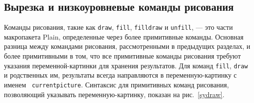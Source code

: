 \documentclass{article} %
\begin{document}
\subsection{Вырезка и низкоуровневые команды рисования}

Команды рисования, такие как {\tt draw}, {\tt fill}, {\tt filldraw} и 
{\tt unfill}, --- это части макропакета Plain,  
определенные через более примитивные команды.
Основная разница между командами рисования, рассмотренными в 
предыдущих разделах, и более примитивными в том, что все примитивные 
команды рисования требуют указания переменной-картинки для хранения 
результатов.
Для команд {\tt fill}, {\tt draw} и родственных им, результаты всегда 
направляются в переменную-картинку с именем {\tt
currentpicture}\label{Dcurpic}.
Синтаксис для примитивных команд рисования, позволяющий указывать 
переменную-картинку, показан на рис.~\ref{sydraw}. 
\end{document}
